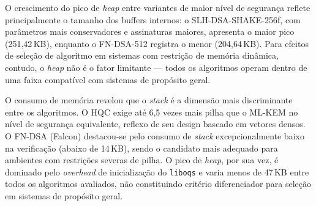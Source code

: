 O crescimento do pico de \textit{heap} entre variantes de maior
nível de segurança reflete principalmente o tamanho dos buffers
internos: o SLH-DSA-SHAKE-256f, com parâmetros mais conservadores
e assinaturas maiores, apresenta o maior pico (251,42\,KB), enquanto
o FN-DSA-512 registra o menor (204,64\,KB).
Para efeitos de seleção de algoritmo em sistemas com restrição de
memória dinâmica, contudo, o \textit{heap} não é o fator
limitante — todos os algoritmos operam dentro de uma faixa
compatível com sistemas de propósito geral.


%

%

O consumo de memória revelou que o \textit{stack} é a dimensão
mais discriminante entre os algoritmos.
O HQC exige até 6,5 vezes mais pilha que o ML-KEM no nível de
segurança equivalente, reflexo de seu design baseado em vetores
densos.
O FN-DSA (Falcon) destacou-se pelo consumo de \textit{stack}
excepcionalmente baixo na verificação (abaixo de 14\,KB),
sendo o candidato mais adequado para ambientes com restrições
severas de pilha.
O pico de \textit{heap}, por sua vez, é dominado pelo
\textit{overhead} de inicialização do \texttt{liboqs} e varia
menos de 47\,KB entre todos os algoritmos avaliados, não
constituindo critério diferenciador para seleção em sistemas
de propósito geral.


%



